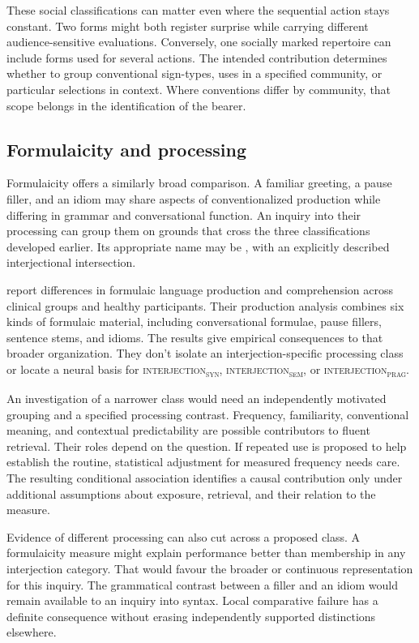 \documentclass[12pt]{article}
\newcommand{\intj}[1]{\textsc{interjection\textsubscript{#1}}}
\begin{document}
These social classifications can matter even where the sequential
action stays constant. Two forms might both register surprise while
carrying different audience-sensitive evaluations. Conversely, one
socially marked repertoire can include forms used for several actions.
The intended contribution determines whether to group conventional
sign-types, uses in a specified community, or particular selections
in context. Where conventions differ by community, that scope belongs
in the identification of the bearer.

\subsection{Formulaicity and processing}

Formulaicity offers a similarly broad comparison. A familiar greeting,
a pause filler, and an idiom may share aspects of conventionalized
production while differing in grammar and conversational function.
An inquiry into their processing can group them on grounds that
cross the three classifications developed earlier. Its appropriate
name may be , with an explicitly described
interjectional intersection.

\textcite{vanlanckersidtis2015} report differences in formulaic
language production and comprehension across clinical groups and
healthy participants. Their production
analysis combines six kinds of formulaic material, including conversational
formulae, pause fillers, sentence stems, and idioms. The results give
empirical consequences to that broader organization. They don't
isolate an interjection-specific processing class or locate a neural
basis for \intj{syn}, \intj{sem}, or \intj{prag}.

An investigation of a narrower class would need an independently
motivated grouping and a specified processing contrast. Frequency,
familiarity, conventional meaning, and contextual predictability are
possible contributors to fluent retrieval. Their roles depend on
the question. If repeated use is proposed to help establish the
routine, statistical adjustment for measured frequency needs care.
The resulting conditional association identifies a causal contribution
only under additional assumptions about exposure, retrieval, and their
relation to the measure.

Evidence of different processing can also cut across a proposed
class. A formulaicity measure might explain performance better than
membership in any interjection category. That would favour the broader
or continuous representation for this inquiry. The grammatical contrast
between a filler and an idiom would remain available to an
inquiry into syntax. Local comparative failure has a definite consequence
without erasing independently supported distinctions elsewhere.
\end{document}
